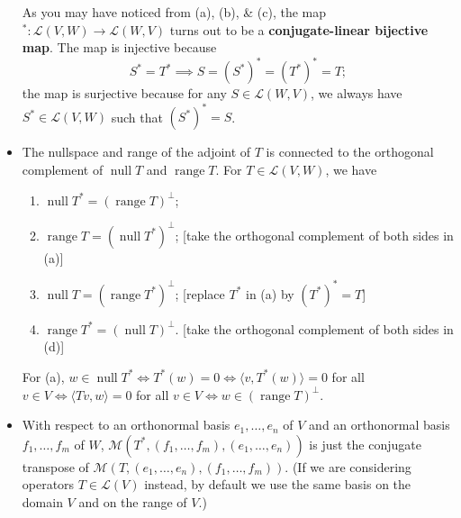 \documentclass{article}
\newcommand{\n}{\operatorname{null}}
\renewcommand{\r}{\operatorname{range}}
\newcommand{\inp}[2]{\langle #1, #2 \rangle}
\newcommand{\LV}{\mathcal{L}(V)}
\newcommand{\LVW}{\mathcal{L}(V,W)}
\newcommand{\M}{\mathcal{M}}
\begin{document}
\begin{itemize}
    As you may have noticed from (a), (b), \& (c), the map $^*: \LVW \to \mathcal{L}(W,V)$ turns out to be a \textbf{conjugate-linear bijective map}. The map is injective because $$S^*=T^* \implies S=(S^*)^*=(T^*)^*=T;$$ the map is surjective because for any $S \in \mathcal{L}(W,V)$, we always have $S^* \in \LVW$ such that $(S^*)^*=S$.
    \item The nullspace and range of the adjoint of $T$ is connected to the orthogonal complement of $\n T$ and $\r T$. For $T \in \LVW$, we have
    \begin{enumerate}[label=(\alph*)]
        \item $\n T^* = (\r T)^\perp$;
        \item $\r T = (\n T^*)^\perp$; [take the orthogonal complement of both sides in (a)]
        \item $\n T = (\r T^*)^\perp$; [replace $T^*$ in (a) by $(T^*)^* = T$]
        \item $\r T^* = (\n T)^\perp$. [take the orthogonal complement of both sides in (d)]
    \end{enumerate}
    For (a), $w \in \n T^* \iff T^*(w) = 0 \iff \inp{v}{T^*(w)} = 0$ for all $v \in V \iff \inp{Tv}{w} = 0$ for all $v \in V \iff w \in (\r T)^\perp$.
    \item With respect to an orthonormal basis $e_1,\dots,e_n$ of $V$ and an orthonormal basis $f_1,\dots,f_m$ of $W$, $\M(T^*,(f_1,\dots,f_m),(e_1,\dots,e_n))$ is just the conjugate transpose of $\M(T,(e_1,\dots,e_n),(f_1,\dots,f_m))$. (If we are considering operators $T \in \LV$ instead, by default we use the same basis on the domain $V$ and on the range of $V$.)
    

\end{itemize}
\end{document}
